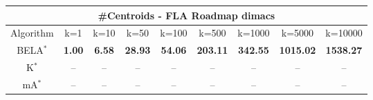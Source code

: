 \begin{tabular}{c|cccccccc}\toprule
\multicolumn{9}{c}{#Centroids - FLA Roadmap dimacs}\\ \midrule
Algorithm & k=1 & k=10 & k=50 & k=100 & k=500 & k=1000 & k=5000 & k=10000 \\ \midrule
BELA$^*$ & \textbf{1.00} & \textbf{6.58} & \textbf{28.93} & \textbf{54.06} & \textbf{203.11} & \textbf{342.55} & \textbf{1015.02} & \textbf{1538.27} \\
K$^*$ & -- & -- & -- & -- & -- & -- & -- & -- \\
mA$^*$ & -- & -- & -- & -- & -- & -- & -- & -- \\ \bottomrule 
\end{tabular}
